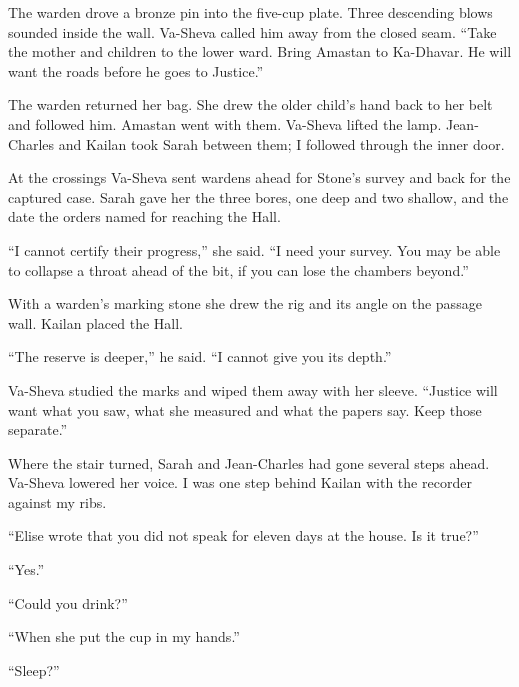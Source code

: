The warden drove a bronze pin into the five-cup plate. Three descending blows sounded inside the wall. Va-Sheva called him away from the closed seam. ``Take the mother and children to the lower ward. Bring Amastan to Ka-Dhavar. He will want the roads before he goes to Justice.''\par

The warden returned her bag. She drew the older child's hand back to her belt and followed him. Amastan went with them. Va-Sheva lifted the lamp. Jean-Charles and Kailan took Sarah between them; I followed through the inner door.\par

At the crossings Va-Sheva sent wardens ahead for Stone's survey and back for the captured case. Sarah gave her the three bores, one deep and two shallow, and the date the orders named for reaching the Hall.\par

``I cannot certify their progress,'' she said. ``I need your survey. You may be able to collapse a throat ahead of the bit, if you can lose the chambers beyond.''\par

With a warden's marking stone she drew the rig and its angle on the passage wall. Kailan placed the Hall.\par

``The reserve is deeper,'' he said. ``I cannot give you its depth.''\par

Va-Sheva studied the marks and wiped them away with her sleeve. ``Justice will want what you saw, what she measured and what the papers say. Keep those separate.''\par

Where the stair turned, Sarah and Jean-Charles had gone several steps ahead. Va-Sheva lowered her voice. I was one step behind Kailan with the recorder against my ribs.\par

``Elise wrote that you did not speak for eleven days at the house. Is it true?''\par

``Yes.''\par

``Could you drink?''\par

``When she put the cup in my hands.''\par

``Sleep?''\par

